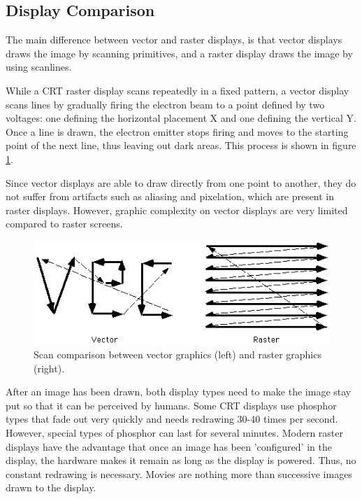 \subsection{Display Comparison}
The main difference between vector and raster displays, is that vector displays draws the image by scanning primitives, and a raster display draws the image by using scanlines. 

While a CRT raster display scans repeatedly in a fixed pattern, a vector display scans lines by gradually firing the electron beam to a point defined by two voltages: one defining the horizontal placement X and one defining the vertical Y. 
Once a line is drawn, the electron emitter stops firing and moves to the starting point of the next line, thus leaving out dark areas. 
This process is shown in figure \ref{fig:vectorscan}.

Since vector displays are able to draw directly from one point to another, they do not suffer from artifacts such as aliasing and pixelation, which are present in raster displays\cite{vector-monitor}.
However, graphic complexity on vector displays are very limited compared to raster screens.

\begin{figure}[h!]
\centering \includegraphics[width=0.8\linewidth]{images/scan.png}
\caption{Scan comparison between vector graphics (left) and raster graphics (right)\cite{vecvsras}.}
\label{fig:vectorscan}
\end{figure}

After an image has been drawn, both display types need to make the image stay put so that it can be perceived by humans. 
Some CRT displays use phosphor types that fade out very quickly and needs redrawing 30-40 times per second\cite{vector-monitor}.
However, special types of phosphor can last for several minutes.
Modern raster displays have the advantage that once an image has been 'configured' in the display, the hardware makes it remain as long as the display is powered. 
Thus, no constant redrawing is necessary\cite{LCD-persistence}.
Movies are nothing more than successive images drawn to the display.

